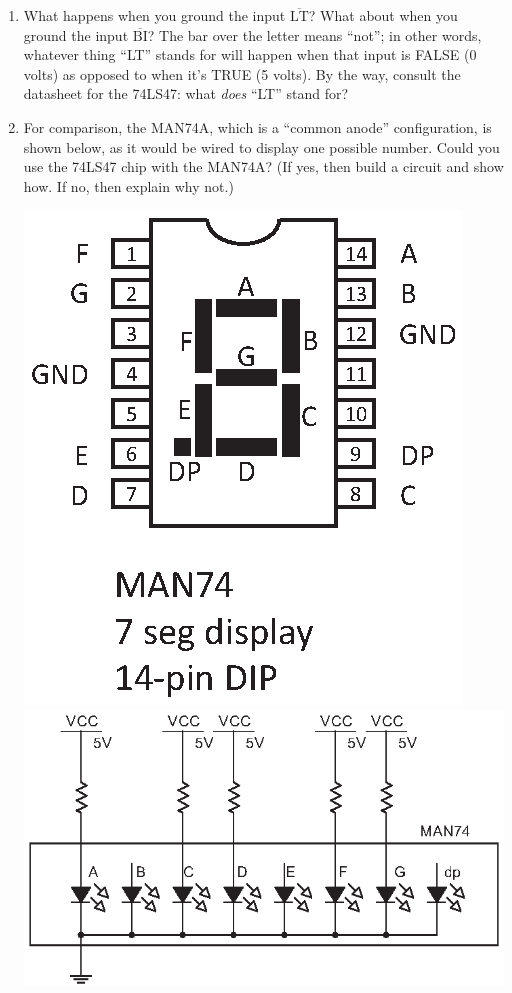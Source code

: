 \begin{enumerate}
\item What happens when you ground the input $\mathrm{\overline{LT}}$?  What about when you ground the input $\mathrm{\overline{BI}}$?  The bar over the letter means ``not''; in other words, whatever thing ``LT'' stands for will happen when that input is FALSE (0 volts) as opposed to when it's TRUE (5 volts).  By the way, consult the datasheet for the 74LS47: what \textit{does} ``LT'' stand for?

\item For comparison, the MAN74A, which is a ``common anode'' configuration, is shown below, as it would be wired to display one possible number.  Could you use the 74LS47 chip with the MAN74A?  (If yes, then build a circuit and show how.  If no, then explain why not.)
\begin{center}
\includegraphics[scale=0.8]{appendices/pinouts/man74.eps}
\includegraphics{counters/man74_circuit.eps}
\end{center}


\end{enumerate}
